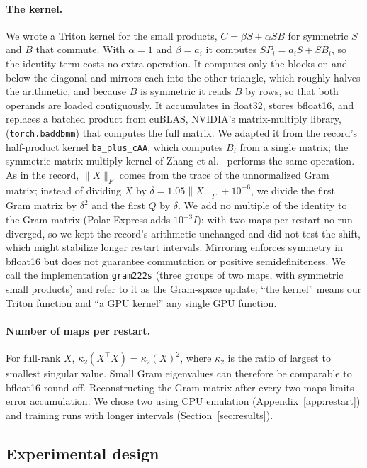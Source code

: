 \documentclass{article}
\begin{document}
\paragraph{The kernel.} We wrote a Triton kernel for the small products, $C=\beta S+\alpha SB$ for symmetric $S$ and $B$ that commute. With $\alpha=1$ and $\beta=a_i$ it computes $SP_i=a_iS+SB_i$, so the identity term costs no extra operation. It computes only the blocks on and below the diagonal and mirrors each into the other triangle, which roughly halves the arithmetic, and because $B$ is symmetric it reads $B$ by rows, so that both operands are loaded contiguously. It accumulates in float32, stores bfloat16, and replaces a batched product from cuBLAS, NVIDIA's matrix-multiply library, (\texttt{torch.baddbmm}) that computes the full matrix. We adapted it from the record's half-product kernel \texttt{ba\_plus\_cAA}, which computes $B_i$ from a single matrix; the symmetric matrix-multiply kernel of Zhang et al.~\cite{gramns} performs the same operation. As in the record, $\|X\|_F$ comes from the trace of the unnormalized Gram matrix; instead of dividing $X$ by $\delta=1.05\|X\|_F+10^{-6}$, we divide the first Gram matrix by $\delta^2$ and the first $Q$ by $\delta$. We add no multiple of the identity to the Gram matrix (Polar Express adds $10^{-3}I$): with two maps per restart no run diverged, so we kept the record's arithmetic unchanged and did not test the shift, which might stabilize longer restart intervals. Mirroring enforces symmetry in bfloat16 but does not guarantee commutation or positive semidefiniteness. We call the implementation \texttt{gram222s} (three groups of two maps, with symmetric small products) and refer to it as the Gram-space update; ``the kernel'' means our Triton function and ``a GPU kernel'' any single GPU function.

\paragraph{Number of maps per restart.} For full-rank $X$, $\kappa_2(X^\top X)=\kappa_2(X)^2$, where $\kappa_2$ is the ratio of largest to smallest singular value. Small Gram eigenvalues can therefore be comparable to bfloat16 round-off. Reconstructing the Gram matrix after every two maps limits error accumulation. We chose two using CPU emulation (Appendix~\ref{app:restart}) and training runs with longer intervals (Section~\ref{sec:results}).

\subsection{Experimental design}
\end{document}
